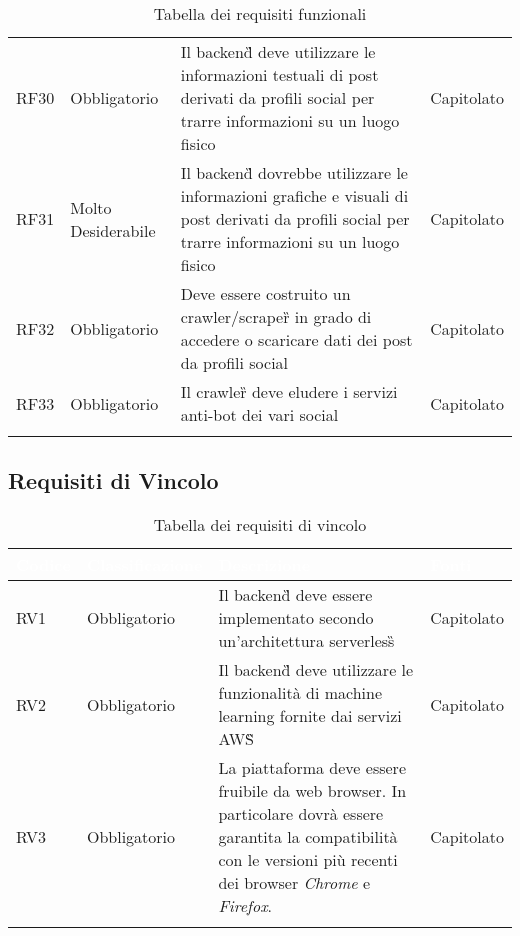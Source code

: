 {\begin{longtable}{C{.15\freewidth} C{.2\freewidth} C{.528\freewidth} C{.15\freewidth}}
      RF30 & Obbligatorio & Il backend\G{} deve utilizzare le informazioni testuali di post derivati da profili social per trarre informazioni su un luogo fisico & Capitolato \\
      RF31 & Molto Desiderabile & Il backend\G{} dovrebbe utilizzare le informazioni grafiche e visuali di post derivati da profili social per trarre informazioni su un luogo fisico & Capitolato \\
      RF32 & Obbligatorio & Deve essere costruito un crawler/scraper\G{} in grado di accedere o scaricare dati dei post da profili social & Capitolato \\
      RF33 & Obbligatorio & Il crawler\G{} deve eludere i servizi anti-bot dei vari social & Capitolato \\
      \bottomrule
      \caption{Tabella dei requisiti funzionali}
      \end{longtable}
}
\subsection{Requisiti di Vincolo}
{
      \setlength{\freewidth}{\dimexpr\textwidth-10\tabcolsep}
      \renewcommand{\arraystretch}{1.5}
      \centering
      \setlength{\aboverulesep}{0pt}
      \setlength{\belowrulesep}{0pt}
      \begin{longtable}{C{.15\freewidth} C{.2\freewidth} C{.528\freewidth} C{.15\freewidth}}
         \toprule
      \textcolor{white}{\textbf{Codice}}&
      \textcolor{white}{\textbf{Classificazione}}&
      \textcolor{white}{\textbf{Descrizione}}&
      \textcolor{white}{\textbf{Fonti}}\\	
      \toprule
      \endhead
      RV1 & Obbligatorio & Il backend\G{} deve essere implementato secondo un'architettura serverless\G{} & Capitolato \\
      RV2 & Obbligatorio & Il backend\G{} deve utilizzare le funzionalità di machine learning fornite dai servizi AWS\G{} & Capitolato \\
      RV3 & Obbligatorio & La piattaforma deve essere fruibile da web browser. In particolare dovrà essere garantita la compatibilità con le versioni più recenti dei browser \textit{Chrome} e \textit{Firefox}. & Capitolato \\
      \bottomrule
      \caption{Tabella dei requisiti di vincolo}
      \end{longtable}
}
